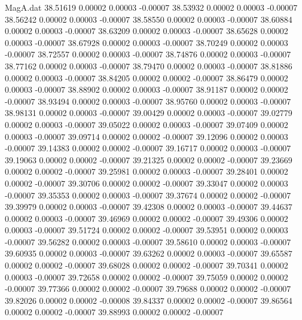 \begin{filecontents}{MagA.dat}
  38.51619    0.00002    0.00003   -0.00007
  38.53932    0.00002    0.00003   -0.00007
  38.56242    0.00002    0.00003   -0.00007
  38.58550    0.00002    0.00003   -0.00007
  38.60884    0.00002    0.00003   -0.00007
  38.63209    0.00002    0.00003   -0.00007
  38.65628    0.00002    0.00003   -0.00007
  38.67928    0.00002    0.00003   -0.00007
  38.70249    0.00002    0.00003   -0.00007
  38.72557    0.00002    0.00003   -0.00007
  38.74876    0.00002    0.00003   -0.00007
  38.77162    0.00002    0.00003   -0.00007
  38.79470    0.00002    0.00003   -0.00007
  38.81886    0.00002    0.00003   -0.00007
  38.84205    0.00002    0.00002   -0.00007
  38.86479    0.00002    0.00003   -0.00007
  38.88902    0.00002    0.00003   -0.00007
  38.91187    0.00002    0.00002   -0.00007
  38.93494    0.00002    0.00003   -0.00007
  38.95760    0.00002    0.00003   -0.00007
  38.98131    0.00002    0.00003   -0.00007
  39.00429    0.00002    0.00003   -0.00007
  39.02779    0.00002    0.00003   -0.00007
  39.05022    0.00002    0.00003   -0.00007
  39.07409    0.00002    0.00003   -0.00007
  39.09714    0.00002    0.00002   -0.00007
  39.12096    0.00002    0.00003   -0.00007
  39.14383    0.00002    0.00002   -0.00007
  39.16717    0.00002    0.00003   -0.00007
  39.19063    0.00002    0.00002   -0.00007
  39.21325    0.00002    0.00002   -0.00007
  39.23669    0.00002    0.00002   -0.00007
  39.25981    0.00002    0.00003   -0.00007
  39.28401    0.00002    0.00002   -0.00007
  39.30706    0.00002    0.00002   -0.00007
  39.33047    0.00002    0.00003   -0.00007
  39.35353    0.00002    0.00003   -0.00007
  39.37674    0.00002    0.00002   -0.00007
  39.39979    0.00002    0.00003   -0.00007
  39.42308    0.00002    0.00003   -0.00007
  39.44637    0.00002    0.00003   -0.00007
  39.46969    0.00002    0.00002   -0.00007
  39.49306    0.00002    0.00003   -0.00007
  39.51724    0.00002    0.00002   -0.00007
  39.53951    0.00002    0.00003   -0.00007
  39.56282    0.00002    0.00003   -0.00007
  39.58610    0.00002    0.00003   -0.00007
  39.60935    0.00002    0.00003   -0.00007
  39.63262    0.00002    0.00003   -0.00007
  39.65587    0.00002    0.00002   -0.00007
  39.68028    0.00002    0.00002   -0.00007
  39.70341    0.00002    0.00003   -0.00007
  39.72658    0.00002    0.00002   -0.00007
  39.75059    0.00002    0.00002   -0.00007
  39.77366    0.00002    0.00002   -0.00007
  39.79688    0.00002    0.00002   -0.00007
  39.82026    0.00002    0.00002   -0.00008
  39.84337    0.00002    0.00002   -0.00007
  39.86564    0.00002    0.00002   -0.00007
  39.88993    0.00002    0.00002   -0.00007

\end{filecontents}
